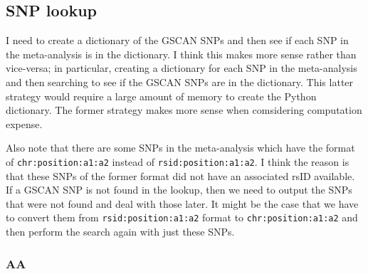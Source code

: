 \documentclass[11pt]{article}
\begin{document}
    \hypertarget{snp-lookup}{%
\subsection{SNP lookup}\label{snp-lookup}}

I need to create a dictionary of the GSCAN SNPs and then see if each SNP
in the meta-analysis is in the dictionary. I think this makes more sense
rather than vice-versa; in particular, creating a dictionary for each
SNP in the meta-analysis and then searching to see if the GSCAN SNPs are
in the dictionary. This latter strategy would require a large amount of
memory to create the Python dictionary. The former strategy makes more
sense when comsidering computation expense.

Also note that there are some SNPs in the meta-analysis which have the
format of \texttt{chr:position:a1:a2} instead of
\texttt{rsid:position:a1:a2}. I think the reason is that these SNPs of
the former format did not have an associated rsID available. If a GSCAN
SNP is not found in the lookup, then we need to output the SNPs that
were not found and deal with those later. It might be the case that we
have to convert them from \texttt{rsid:position:a1:a2} format to
\texttt{chr:position:a1:a2} and then perform the search again with just
these SNPs.

    \hypertarget{aa}{%
\subsubsection{AA}\label{aa}}
\end{document}
